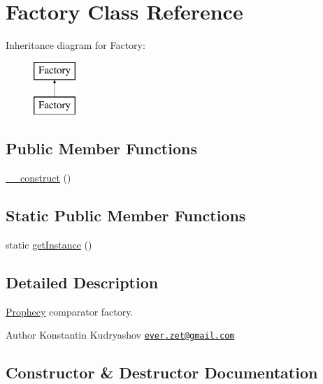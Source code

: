 \hypertarget{class_prophecy_1_1_comparator_1_1_factory}{}\section{Factory Class Reference}
\label{class_prophecy_1_1_comparator_1_1_factory}
Inheritance diagram for Factory\+:\begin{figure}[H]
\begin{center}
\leavevmode
\includegraphics[height=2.000000cm]{class_prophecy_1_1_comparator_1_1_factory}
\end{center}
\end{figure}
\subsection*{Public Member Functions}
\begin{DoxyCompactItemize}
\item 
\mbox{\hyperlink{class_prophecy_1_1_comparator_1_1_factory_a095c5d389db211932136b53f25f39685}{\+\_\+\+\_\+construct}} ()
\end{DoxyCompactItemize}
\subsection*{Static Public Member Functions}
\begin{DoxyCompactItemize}
\item 
static \mbox{\hyperlink{class_prophecy_1_1_comparator_1_1_factory_ac93fbec81f07e5d15f80db907e63dc10}{get\+Instance}} ()
\end{DoxyCompactItemize}


\subsection{Detailed Description}
\mbox{\hyperlink{namespace_prophecy_1_1_prophecy}{Prophecy}} comparator factory.

\begin{DoxyAuthor}{Author}
Konstantin Kudryashov \href{mailto:ever.zet@gmail.com}{\tt ever.\+zet@gmail.\+com} 
\end{DoxyAuthor}


\subsection{Constructor \& Destructor Documentation}
\mbox{\label{class_prophecy_1_1_comparator_1_1_factory_a095c5d389db211932136b53f25f39685}} 
